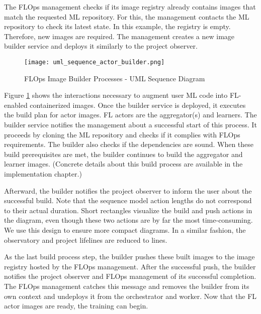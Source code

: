 The FLOps management checks if its image registry already contains images that match the requested ML repository.
For this, the management contacts the ML repository to check its latest state.
In this example, the registry is empty.
Therefore, new images are required.
The management creates a new image builder service and deploys it similarly to the project observer.

\begin{figure}[h]
    \begin{adjustwidth}{-0.2\paperwidth}{-0.2\paperwidth}
        \centering
        \texttt{[image: uml\_sequence\_actor\_builder.png]}
        \caption{FLOps Image Builder Processes - UML Sequence Diagram}
        \label{fig:uml_sequence_builder}
    \end{adjustwidth}
\end{figure}

Figure \ref{fig:uml_sequence_builder} shows the interactions necessary to augment user ML code into FL-enabled containerized images.
Once the builder service is deployed, it executes the build plan for actor images.
FL actors are the aggregator(s) and learners.
The builder service notifies the management about a successful start of this process.
It proceeds by cloning the ML repository and checks if it complies with FLOps requirements.
The builder also checks if the dependencies are sound.
When these build prerequisites are met, the builder continues to build the aggregator and learner images.
(Concrete details about this build process are available in the implementation chapter.)

Afterward, the builder notifies the project observer to inform the user about the successful build.
Note that the sequence model action lengths do not correspond to their actual duration.
Short rectangles visualize the build and push actions in the diagram, even though these two actions are by far the most time-consuming.
We use this design to ensure more compact diagrams.
In a similar fashion, the observatory and project lifelines are reduced to lines.

As the last build process step, the builder pushes these built images to the image registry hosted by the FLOps management.
After the successful push, the builder notifies the project observer and FLOps management of its successful completion.
The FLOps management catches this message and removes the builder from its own context and undeploys it from the orchestrator and worker.
Now that the FL actor images are ready, the training can begin.

